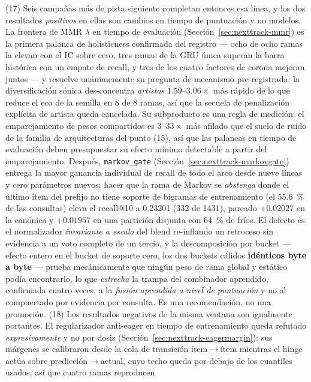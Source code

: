 \documentclass[11pt]{article}
\begin{document}
(17) Seis campañas más de pista siguiente completan entonces esa línea, y los dos
resultados \emph{positivos} en ellas son cambios en tiempo de puntuación y no
modelos. La frontera de MMR $\lambda$ en tiempo de evaluación
(Sección~\ref{sec:nexttrack-mmr}) es la primera palanca de holisticness confirmada
del registro --- ocho de ocho ramas la elevan con el IC sobre cero, tres ramas de la
GRU única superan la barra histórica con un empate de recall, y tres de los cuatro
factores de corona mejoran juntos --- y resuelve unánimemente su pregunta de
mecanismo pre-registrada: la diversificación sónica des-concentra \emph{artistas}
$\numrange{1.59}{3.06}\times$ más rápido de lo que reduce el eco de la semilla en 8
de 8 ramas, así que la secuela de penalización explícita de artista queda cancelada.
Su subproducto es una regla de medición: el emparejamiento de pesos compartidos es
$\numrange{3}{33}\times$ más afilado que el suelo de ruido de la familia de
arquitecturas del punto (15), así que las palancas en tiempo de evaluación deben
presupuestar su efecto mínimo detectable a partir del emparejamiento. Después,
\texttt{markov\_gate} (Sección~\ref{sec:nexttrack-markovgate}) entrega la mayor
ganancia individual de recall de todo el arco desde nueve líneas y cero parámetros
nuevos: hacer que la rama de Markov se \emph{abstenga} donde el último ítem del
prefijo no tiene soporte de bigramas de entrenamiento (el \SI{55.6}{\percent} de las
consultas) eleva el recall@10 a \num{0.23201} (\num{332} de \num{1431}), pareado
$+\num{0.02027}$ en la canónica y $+\num{0.01957}$ en una partición disjunta con
\SI{64}{\percent} de fríos. El defecto es el normalizador \emph{invariante a escala}
del blend re-inflando un retroceso sin evidencia a un voto completo de un tercio, y
la descomposición por bucket --- efecto entero en el bucket de soporte cero, los dos
buckets cálidos \textbf{idénticos byte a byte} --- prueba mecánicamente que ningún
peso de rama global y estático podía encontrarlo, lo que \emph{estrecha} la trampa
del combinador aprendido, confirmada cuatro veces, a la \emph{fusión aprendida a
nivel de puntuación} y no al compuertado por evidencia por consulta. Es una
recomendación, no una promoción.
(18) Los resultados negativos de la misma ventana son igualmente portantes. El
regularizador anti-eager en tiempo de entrenamiento queda refutado
\emph{expresivamente} y no por dosis
(Sección~\ref{sec:nexttrack-eagermargin}): sus márgenes se calibraron desde la cola
de transición ítem$\to$ítem mientras el hinge actúa sobre predicción$\to$actual,
cuyo techo queda por debajo de los cuantiles usados, así que cuatro ramas reproducen
\end{document}
